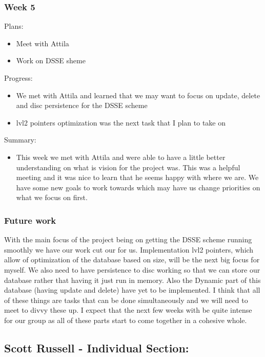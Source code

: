 \documentclass[onecolumn, draftclsnofoot,10pt, compsoc]{IEEEtran}
\begin{document}
\subsubsection{Week 5}
\noindent Plans: 
\begin{itemize}
  \item Meet with Attila
  \item Work on DSSE sheme
\end{itemize} 

\noindent Progress: 
\begin{itemize}
  \item We met with Attila and learned that we may want to focus on update, delete and disc persistence for the DSSE scheme
  \item lvl2 pointers optimization was the next task that I plan to take on
 \end{itemize}

\noindent Summary: 
\begin{itemize}
  \item This week we met with Attila and were able to have a little better understanding on what is vision for the project was. This was a helpful meeting and it was nice to learn that he seems happy with where we are.
We have some new goals to work towards which may have us change priorities on what we focus on first. 
\end{itemize}

\subsubsection{Future work}
With the main focus of the project being on getting the DSSE scheme running smoothly we have our work cut our for us. Implementation lvl2 pointers, which allow of optimization of the database based on size, will be the next big focus for myself. We also need to have persistence to disc working so that we can store our database rather that having it just run in memory. Also the Dynamic part of this database (having update and delete) have yet to be implemented. I think that all of these things are tasks that can be done simultaneously and we will need to meet to divvy these up. I expect that the next few weeks with be quite intense for our group as all of these parts start to come together in a cohesive whole. 

\subsection{Scott Russell - Individual Section:}
\end{document}
